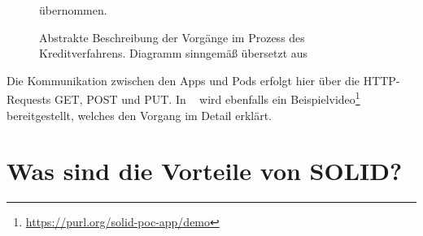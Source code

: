\documentclass[acmtog]{acmart}
\begin{document}
\begin{figure}
\label{fig:enterprise_example}
\centering

\caption{Abstrakte Beschreibung der Vorgänge im Prozess des Kreditverfahrens. Diagramm sinngemäß übersetzt aus ~\cite{DBLP:conf/i-semantics/HenselmannKSS0H22}} übernommen.
\end{figure}

Die Kommunikation zwischen den Apps und Pods erfolgt hier über die HTTP-Requests GET, POST und PUT.
In ~\cite{DBLP:conf/i-semantics/HenselmannKSS0H22} wird ebenfalls ein Beispielvideo\footnote{\url{https://purl.org/solid-poc-app/demo}} bereitgestellt, welches den Vorgang im Detail erklärt.
\label{section:wasSindDieVorteileVonSolid}
\section{Was sind die Vorteile von SOLID?}


 
\end{document}
